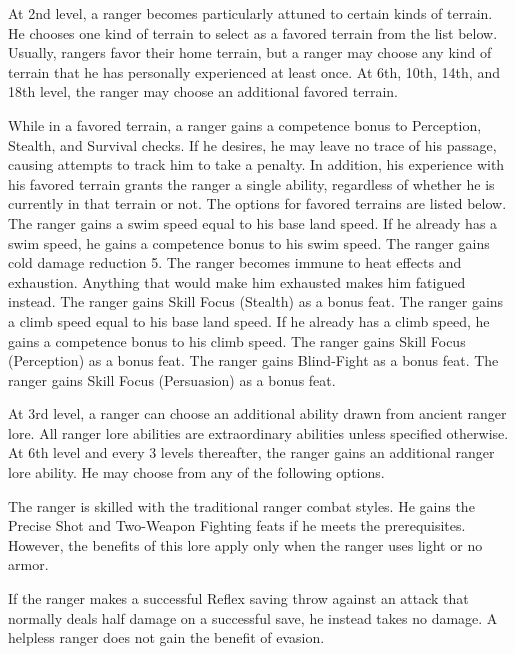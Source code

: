  At 2nd level, a ranger becomes particularly attuned to certain kinds of terrain. He chooses one kind of terrain to select as a favored terrain from the list below. Usually, rangers favor their home terrain, but a ranger may choose any kind of terrain that he has personally experienced at least once. At 6th, 10th, 14th, and 18th level, the ranger may choose an additional favored terrain.
\par While in a favored terrain, a ranger gains a  competence bonus to Perception, Stealth, and Survival checks. If he desires, he may leave no trace of his passage, causing attempts to track him to take a  penalty. In addition, his experience with his favored terrain grants the ranger a single ability, regardless of whether he is currently in that terrain or not. The options for favored terrains are listed below.
 The ranger gains a swim speed equal to his base land speed. If he already has a swim speed, he gains a  competence bonus to his swim speed.
 The ranger gains cold damage reduction 5.
 The ranger becomes immune to heat effects and exhaustion. Anything that would make him exhausted makes him fatigued instead.
 The ranger gains Skill Focus (Stealth) as a bonus feat.
 The ranger gains a climb speed equal to his base land speed. If he already has a climb speed, he gains a  competence bonus to his climb speed.
 The ranger gains Skill Focus (Perception) as a bonus feat.
 The ranger gains Blind-Fight as a bonus feat.
 The ranger gains Skill Focus (Persuasion) as a bonus feat.

 At 3rd level, a ranger can choose an additional ability drawn from ancient ranger lore. All ranger lore abilities are extraordinary abilities unless specified otherwise. At 6th level and every 3 levels thereafter, the ranger gains an additional ranger lore ability. He may choose from any of the following options.

 The ranger is skilled with the traditional ranger combat styles. He gains the Precise Shot and Two-Weapon Fighting feats if he meets the prerequisites. However, the benefits of this lore apply only when the ranger uses light or no armor.

 If the ranger makes a successful Reflex saving throw against an attack that normally deals half damage on a successful save, he instead takes no damage. A helpless ranger does not gain the benefit of evasion.

